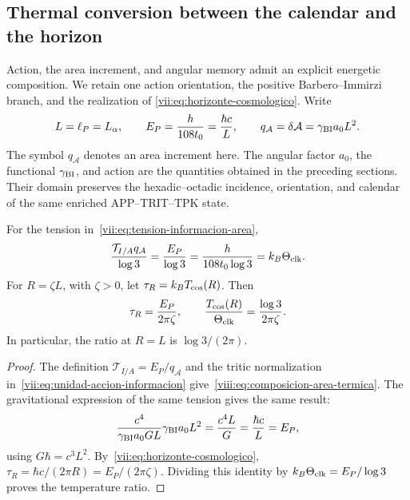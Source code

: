 
\subsection{Thermal conversion between the calendar and the horizon}
\label{viii:subsec:conversion-termica-calendario-horizonte}

Action, the area increment, and angular memory admit an explicit
energetic composition. We retain one action orientation, the positive
Barbero--Immirzi branch, and the realization of
\eqref{vii:eq:horizonte-cosmologico}. Write
\[
 L=\ell_P=L_\alpha,\qquad
 E_P=\frac{h}{108t_0}=\frac{\hbar c}{L},\qquad
 q_{\mathcal A}=\delta\mathcal A=\gamma_{\rm BI}a_0L^2.
\]
The symbol \(q_{\mathcal A}\) denotes an area increment here.
The angular factor \(a_0\), the functional \(\gamma_{\rm BI}\), and
action are the quantities obtained in the preceding sections.
Their domain preserves the hexadic--octadic incidence, orientation,
and calendar of the same enriched APP--TRIT--TPK state.

\begin{proposition}
\label{viii:prop:composicion-area-termica}
For the tension in~\eqref{vii:eq:tension-informacion-area},
\begin{equation}
 \frac{\mathcal T_{I/A}q_{\mathcal A}}{\log3}
 =\frac{E_P}{\log3}
 =\frac{h}{108t_0\log3}
 =k_B\Theta_{\rm clk}.
 \label{viii:eq:composicion-area-termica}
\end{equation}
For \(R=\zeta L\), with \(\zeta>0\), let
\(\tau_R=k_BT_{\rm cos}(R)\). Then
\begin{equation}
 \tau_R=\frac{E_P}{2\pi\zeta},\qquad
 \frac{T_{\rm cos}(R)}{\Theta_{\rm clk}}
 =\frac{\log3}{2\pi\zeta}.
 \label{viii:eq:conversion-dos-temperaturas}
\end{equation}
In particular, the ratio at \(R=L\) is \(\log3/(2\pi)\).
\end{proposition}
\begin{proof}
The definition \(\mathcal T_{I/A}=E_P/q_{\mathcal A}\) and the
tritic normalization in~\eqref{vii:eq:unidad-accion-informacion}
give~\eqref{viii:eq:composicion-area-termica}. The gravitational
expression of the same tension gives the same result:
\[
 \frac{c^4}{\gamma_{\rm BI}a_0GL}
        \gamma_{\rm BI}a_0L^2
 =\frac{c^4L}{G}=\frac{\hbar c}{L}=E_P,
\]
using \(G\hbar=c^3L^2\).
By~\eqref{vii:eq:horizonte-cosmologico},
\(\tau_R=\hbar c/(2\pi R)=E_P/(2\pi\zeta)\).
Dividing this identity by \(k_B\Theta_{\rm clk}=E_P/\log3\)
proves the temperature ratio.
\end{proof}

